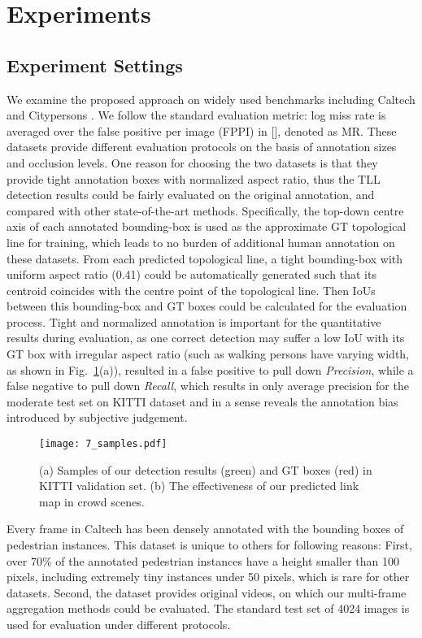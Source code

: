 \documentclass[runningheads]{llncs}
\begin{document}
\section{Experiments}
\subsection{Experiment Settings}
We examine the proposed approach on widely used benchmarks including Caltech \cite{Caltech} and Citypersons \cite{CityPersons}. We follow the standard evaluation metric: log miss rate is averaged over the false positive per image (FPPI) in [], denoted as MR. These datasets provide different evaluation protocols on the basis of annotation sizes and occlusion levels. One reason for choosing the two datasets is that they provide tight annotation boxes with normalized aspect ratio, thus the TLL detection results could be fairly evaluated on the original annotation, and compared with other state-of-the-art methods. Specifically, the top-down centre axis of each annotated bounding-box is used as the approximate GT topological line for training, which leads to no burden of additional human annotation on these datasets. From each predicted topological line, a tight bounding-box with uniform aspect ratio (0.41) could be automatically generated such that its centroid coincides with the centre point of the topological line. Then IoUs between this bounding-box and GT boxes could be calculated for the evaluation process. Tight and normalized annotation is important for the quantitative results during evaluation, as one correct detection may suffer a low IoU with its GT box with irregular aspect ratio (such as walking persons have varying width, as shown in Fig.~\ref{fig7}(a)), resulted in a false positive to pull down \textit{Precision}, while a false negative to pull down \textit{Recall}, which results in only  average precision for the moderate test set on KITTI dataset \cite{KITTI} and in a sense reveals the annotation bias introduced by subjective judgement.
\begin{figure}[t]
	\centering
	\texttt{[image: 7\_samples.pdf]}
	\caption{(a) Samples of our detection results (green) and GT boxes (red) in KITTI validation set. (b) The effectiveness of our predicted link map in crowd scenes.}
	\label{fig7}
\end{figure}

Every frame in Caltech has been densely annotated with the bounding boxes of pedestrian instances. This dataset is unique to others for following reasons: First, over 70\% of the annotated pedestrian instances have a height smaller than 100 pixels, including extremely tiny instances under 50 pixels, which is rare for other datasets. Second, the dataset provides original videos, on which our multi-frame aggregation methods could be evaluated. The standard test set of 4024 images is used for evaluation under different protocols.
\end{document}

